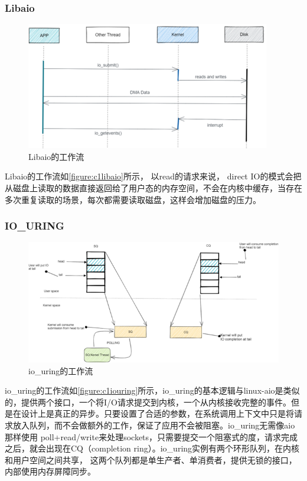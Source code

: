 \subsubsection{Libaio}

\begin{figure}[htb]
    \figureCapSet
    \centering
    \includegraphics[width=.8\linewidth]{figure/c1/libaio.png}
    \caption{Libaio的工作流}
    \label{figure:c1libaio}
\end{figure}

Libaio的工作流如\autoref{figure:c1libaio}所示， 以read的请求来说， direct IO的模式会把从磁盘上读取的数据直接返回给了用户态的内存空间，不会在内核中缓存，当存在多次重复读取的场景，每次都需要读取磁盘，这样会增加磁盘的压力。


\subsubsection{IO\_URING}

\begin{figure}[htb]
    \figureCapSet
    \centering
    \includegraphics[width=.8\linewidth]{figure/c1/iouring.png}
    \caption{io\_uring的工作流}
    \label{figure:c1iouring}
\end{figure}

io\_uring的工作流如\autoref{figure:c1iouring}所示，io\_uring的基本逻辑与linux-aio是类似的，提供两个接口，一个将I/O请求提交到内核，一个从内核接收完整的事件。但是在设计上是真正的异步。只要设置了合适的参数，在系统调用上下文中只是将请求放入队列，而不会做额外的工作，保证了应用不会被阻塞。io\_uring无需像aio那样使用 poll+read/write来处理sockets，只需要提交一个阻塞式的度，请求完成之后，就会出现在CQ（completion ring）。io\_uring实例有两个环形队列，在内核和用户空间之间共享， 这两个队列都是单生产者、单消费者，提供无锁的接口，内部使用内存屏障同步。

